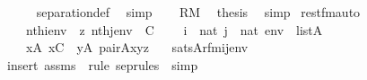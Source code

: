 \begin{isabellebody}
\ \ \ \ \isamarkupfalse%
\ separation{\isacharunderscore}{\kern0pt}def\ \isamarkupfalse%
\ simp\isanewline
\ \ \isamarkupfalse%
\ {\isacartoucheopen}R{\isasymin}M{\isacartoucheclose}\ \isamarkupfalse%
\ {\isacharquery}{\kern0pt}thesis\ \isamarkupfalse%
\ simp\isanewline
{}\isamarkupfalse%
%
\endisatagproof
{\isafoldproof}%
%
\isadelimproof
\isanewline
%
\endisadelimproof
\isanewline
\isanewline
{}\isamarkupfalse%
\ rest{\isacharunderscore}{\kern0pt}fm{\isacharunderscore}{\kern0pt}auto{\isacharcolon}{\kern0pt}\isanewline
\ \ \isanewline
\ \ \ \ {\isachardoublequoteopen}nth{\isacharparenleft}{\kern0pt}i{\isacharcomma}{\kern0pt}env{\isacharparenright}{\kern0pt}\ {\isacharequal}{\kern0pt}\ z{\isachardoublequoteclose}\ {\isachardoublequoteopen}nth{\isacharparenleft}{\kern0pt}j{\isacharcomma}{\kern0pt}env{\isacharparenright}{\kern0pt}\ {\isacharequal}{\kern0pt}\ C{\isachardoublequoteclose}\isanewline
\ \ \ \ {\isachardoublequoteopen}i\ {\isasymin}\ nat{\isachardoublequoteclose}\ {\isachardoublequoteopen}j\ {\isasymin}\ nat{\isachardoublequoteclose}\ {\isachardoublequoteopen}env\ {\isasymin}\ list{\isacharparenleft}{\kern0pt}A{\isacharparenright}{\kern0pt}{\isachardoublequoteclose}\isanewline
\ \ \isanewline
\ \ \ \ {\isachardoublequoteopen}{\isacharparenleft}{\kern0pt}{\isasymexists}x{\isasymin}A{\isachardot}{\kern0pt}\ x{\isasymin}C\ {\isacharampersand}{\kern0pt}\ {\isacharparenleft}{\kern0pt}{\isasymexists}y{\isasymin}A{\isachardot}{\kern0pt}\ pair{\isacharparenleft}{\kern0pt}{\isacharhash}{\kern0pt}{\isacharhash}{\kern0pt}A{\isacharcomma}{\kern0pt}x{\isacharcomma}{\kern0pt}y{\isacharcomma}{\kern0pt}z{\isacharparenright}{\kern0pt}{\isacharparenright}{\kern0pt}{\isacharparenright}{\kern0pt}\isanewline
\ \ {\isasymlongleftrightarrow}\ sats{\isacharparenleft}{\kern0pt}A{\isacharcomma}{\kern0pt}{\isacharquery}{\kern0pt}rfm{\isacharparenleft}{\kern0pt}i{\isacharcomma}{\kern0pt}j{\isacharparenright}{\kern0pt}{\isacharcomma}{\kern0pt}env{\isacharparenright}{\kern0pt}{\isachardoublequoteclose}\isanewline
%
\isadelimproof
\ \ %
\endisadelimproof
%
\isatagproof
{}\isamarkupfalse%
\ {\isacharparenleft}{\kern0pt}insert\ assms\ {\isacharsemicolon}{\kern0pt}\ {\isacharparenleft}{\kern0pt}rule\ sep{\isacharunderscore}{\kern0pt}rules\ {\isacharbar}{\kern0pt}\ simp{\isacharparenright}{\kern0pt}{\isacharplus}{\kern0pt}{\isacharparenright}{\kern0pt}%
\endisatagproof
{\isafoldproof}%

\end{isabellebody}
